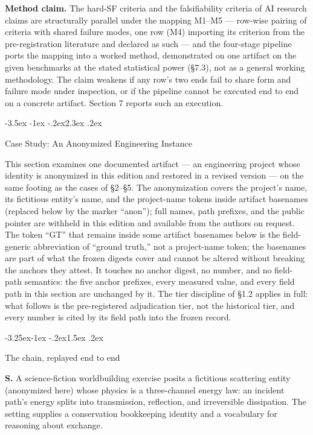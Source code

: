 \documentclass[11pt,a4paper]{article}
\makeatletter
\renewcommand\section{\@startsection{section}{1}{\z@}%
  {-3.5ex \@plus -1ex \@minus -.2ex}{2.3ex \@plus .2ex}%
  {\normalfont\Large\bfseries\raggedright}}
\renewcommand\subsection{\@startsection{subsection}{2}{\z@}%
  {-3.25ex\@plus -1ex \@minus -.2ex}{1.5ex \@plus .2ex}%
  {\normalfont\large\bfseries\raggedright}}
\makeatother
\begin{document}
\textbf{Method claim.} The hard-SF criteria and the falsifiability criteria of AI research claims are structurally parallel under the mapping M1–M5 — row-wise pairing of criteria with shared failure modes, one row (M4) importing its criterion from the pre-registration literature and declared as such — and the four-stage pipeline ports the mapping into a worked method, demonstrated on one artifact on the given benchmarks at the stated statistical power (§7.3), not as a general working methodology. The claim weakens if any row's two ends fail to share form and failure mode under inspection, or if the pipeline cannot be executed end to end on a concrete artifact. Section 7 reports such an execution.

\section{Case Study: An Anonymized Engineering Instance}

This section examines one documented artifact — an engineering project whose identity is anonymized in this edition and restored in a revised version — on the same footing as the cases of §2–§5. The anonymization covers the project's name, its fictitious entity's name, and the project-name tokens inside artifact basenames (replaced below by the marker ``anon''); full names, path prefixes, and the public pointer are withheld in this edition and available from the authors on request. The token ``GT'' that remains inside some artifact basenames below is the field-generic abbreviation of ``ground truth,'' not a project-name token; the basenames are part of what the frozen digests cover and cannot be altered without breaking the anchors they attest. It touches no anchor digest, no number, and no field-path semantics: the five anchor prefixes, every measured value, and every field path in this section are unchanged by it. The tier discipline of §1.2 applies in full: what follows is the pre-registered adjudication tier, not the historical tier, and every number is cited by its field path into the frozen record.

\subsection{The chain, replayed end to end}

\textbf{S.} A science-fiction worldbuilding exercise posits a fictitious scattering entity (anonymized here) whose physics is a three-channel energy law: an incident path's energy splits into transmission, reflection, and irreversible dissipation. The setting supplies a conservation bookkeeping identity and a vocabulary for reasoning about exchange.
\end{document}
